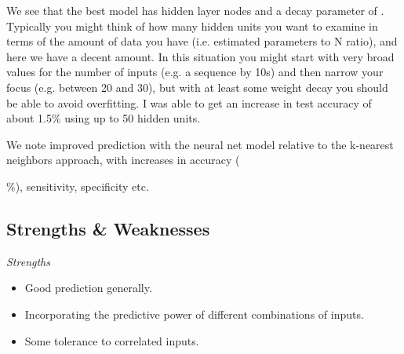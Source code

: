 \documentclass[english,nohyper,titlepage]{tufte-handout}\usepackage{knitr}
\begin{document}
We see that the best model has  hidden layer nodes and a decay parameter of .  Typically you might think of how many hidden units you want to examine in terms of the amount of data you have (i.e. estimated parameters to N ratio), and here we have a decent amount.  In this situation you might start with very broad values for the number of inputs (e.g. a sequence by 10s) and then narrow your focus (e.g. between 20 and 30), but with at least some weight decay you should be able to avoid overfitting. I was able to get an increase in test accuracy of about 1.5\% using up to 50 hidden units.

\begin{knitrout}\footnotesize
{}\color{fgcolor}\begin{kframe}
\begin{alltt}
 \hlkwb{=} \hlstd{(results_nnet, wine_test[,}\hlopt{-}\hlstd{])}
\hlstd{(preds_nnet, wine_test[,}\hlstd{],} \hlstd{=}\hlstd{)}
\end{alltt}


{\ttfamily\noindent\bfseries{}}

{\ttfamily\noindent\bfseries{}}\end{kframe}
\end{knitrout}


We note improved prediction with the neural net model relative to the k-nearest neighbors approach, with increases in accuracy (

{\ttfamily\noindent\bfseries\color{errorcolor}{\\Error in eval(expr, envir, enclos) : object 'conf\_nnet' not found}}\%), sensitivity, specificity etc.

\subsection{Strengths \& Weaknesses}

\emph{Strengths}
\begin{itemize}
  \item Good prediction generally.
  \item Incorporating the predictive power of different combinations of inputs.
  \item Some tolerance to correlated inputs.
\end{itemize}
\end{document}
